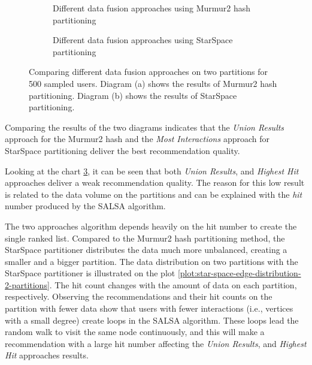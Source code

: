 \begin{figure}[!htb]
    \centering
    \begin{subfigure}{\textwidth}
        \centering
        
        \caption{Different data fusion approaches using Murmur2 hash partitioning}
        \label{plot:murmur2-data-fusion}
    \end{subfigure}\qquad

    \begin{subfigure}{\textwidth}
        \centering
        
        \caption{Different data fusion approaches using StarSpace partitioning}
        \label{plot:star-space-data-fusion}
    \end{subfigure}\qquad
    \caption{Comparing different data fusion approaches on two partitions for 500 sampled users. Diagram (a) shows the results of Murmur2 hash partitioning. Diagram (b) shows the results of StarSpace partitioning.}
\end{figure}


Comparing the results of the two diagrams indicates that the \emph{Union Results} approach for the Murmur2 hash and the \emph{Most Interactions} approach for StarSpace partitioning deliver the best recommendation quality. 


Looking at the chart \ref{plot:star-space-data-fusion}, it can be seen that both \emph{Union Results}, and \emph{Highest Hit} approaches deliver a weak recommendation quality. The reason for this low result is related to the data volume on the partitions and can be explained with the \emph{hit} number produced by the SALSA algorithm. 


The two approaches algorithm depends heavily on the hit number to create the single ranked list. Compared to the Murmur2 hash partitioning method, the StarSpace partitioner distributes the data much more unbalanced, creating a smaller and a bigger partition. The data distribution on two partitions with the StarSpace partitioner is illustrated on the plot \ref{plot:star-space-edge-distribution-2-partitions}. The hit count changes with the amount of data on each partition, respectively. Observing the recommendations and their hit counts on the partition with fewer data show that users with fewer interactions (i.e., vertices with a small degree) create loops in the SALSA algorithm. These loops lead the random walk to visit the same node continuously, and this will make a recommendation with a large hit number affecting the \emph{Union Results}, and \emph{Highest Hit} approaches results.



